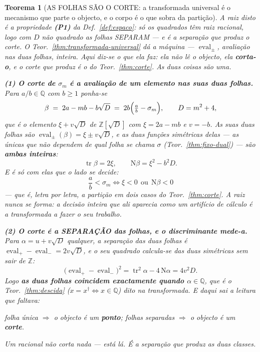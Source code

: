 \documentclass[11pt,a4paper]{article}
\newtheorem{teorema}{Teorema}
\newcommand{\dg}{^{\dagger}}
\begin{document}
\begin{teorema}[AS FOLHAS SÃO O CORTE: a transformada universal é o mecanismo que parte
o objecto, e o corpo é o que sobra da partição]\label{thm:folhas-corte}
\emph{A raiz disto é a propriedade} \textbf{(P1)} \emph{da Def.~\ref{def:espaco}}: só os
quadrados têm raiz racional, logo com $D$ não quadrado as folhas SEPARAM --- e é a
separação que produz o corte.
O Teor.~\ref{thm:transformada-universal} dá a máquina --- $\operatorname{eval}_\pm$, avaliação
nas duas folhas, inteira. Aqui diz-se o que ela \emph{faz}: ela não lê o objecto, ela
\textbf{corta-o}, e o corte que produz é o do Teor.~\ref{thm:corte}. As duas coisas são
uma.

\textbf{(1) O corte de $\sigma_m$ é a avaliação de um elemento nas suas duas folhas.}
Para $a/b\in\mathbb{Q}$ com $b\geq1$ ponha-se
\[
\beta \;=\; 2a-mb-b\sqrt D \;=\; 2b\Bigl(\tfrac ab-\sigma_m\Bigr),
\qquad D=m^{2}+4 ,
\]
que é o elemento $\xi+v\sqrt D$ de $\mathbb{Z}[\sqrt D]$ com $\xi=2a-mb$ e $v=-b$. As suas
duas folhas são $\operatorname{eval}_\pm(\beta)=\xi\pm v\sqrt D$, e as duas funções
simétricas delas --- as \emph{únicas} que não dependem de qual folha se chama $\sigma$
(Teor.~\ref{thm:fixo-dual}) --- são \textbf{ambas inteiras}:
\[
\operatorname{tr}\beta=2\xi ,\qquad \mathrm{N}\beta=\xi^{2}-b^{2}D .
\]
E é só com elas que o lado se decide:
\[
\boxed{\;\frac ab<\sigma_m \iff \xi<0 \ \ \text{ou}\ \ \mathrm{N}\beta<0\;}
\]
--- que é, letra por letra, a partição em dois casos do Teor.~\ref{thm:corte}. \emph{A raiz
nunca se forma}: a decisão inteira que ali aparecia como um artifício de cálculo é a
transformada a fazer o seu trabalho.

\textbf{(2) O corte é a SEPARAÇÃO das folhas, e o discriminante mede-a.} Para
$\alpha=u+v\sqrt D$ qualquer, a separação das duas folhas é
$\operatorname{eval}_+-\operatorname{eval}_-=2v\sqrt D$, e o seu quadrado calcula-se das
duas simétricas sem sair de $\mathbb{Z}$:
\[
\bigl(\operatorname{eval}_+-\operatorname{eval}_-\bigr)^{2}
=\operatorname{tr}^{2}\alpha-4\,\mathrm{N}\alpha=4v^{2}D .
\]
Logo \textbf{as duas folhas coincidem exactamente quando $\alpha\in\mathbb{Q}$}, que é o
Teor.~\ref{thm:descida} ($x=x\dg\iff x\in\mathbb{Q}$) dito na transformada. E daqui sai a
leitura que faltava:
\begin{center}
\emph{folha única $\Rightarrow$ o objecto é um \textbf{ponto}; folhas separadas
$\Rightarrow$ o objecto é um \textbf{corte}.}
\end{center}
Um racional não corta nada --- está lá. É a separação que produz as duas classes.


\end{teorema}
\end{document}
